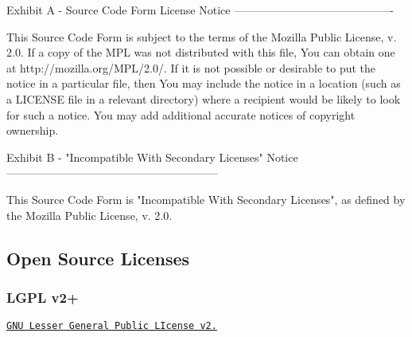 \begin{DoxyVerb}
Exhibit A - Source Code Form License Notice
-------------------------------------------

This Source Code Form is subject to the terms of the Mozilla Public
License, v. 2.0. If a copy of the MPL was not distributed with this
file, You can obtain one at http://mozilla.org/MPL/2.0/.
If it is not possible or desirable to put the notice in a particular
file, then You may include the notice in a location (such as a LICENSE
file in a relevant directory) where a recipient would be likely to look
for such a notice.
You may add additional accurate notices of copyright ownership.

Exhibit B - "Incompatible With Secondary Licenses" Notice
---------------------------------------------------------

This Source Code Form is "Incompatible With Secondary Licenses", as
defined by the Mozilla Public License, v. 2.0.\end{DoxyVerb}
 \hypertarget{aboutLicensesOSL}{}\subsection{Open Source Licenses}\label{aboutLicensesOSL}
\hypertarget{aboutLicensesOSL_licenseOSLGPLv2}{}\subsubsection{L\+G\+P\+L v2+}\label{aboutLicensesOSL_licenseOSLGPLv2}
\href{https://opensource.org/licenses/LGPL-2.1}{\tt G\+NU Lesser General Public L\+Icense v2.}

